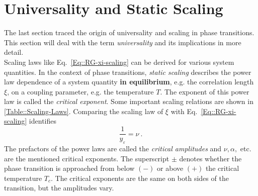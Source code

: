 	\section{Universality and Static Scaling} \label{Section::Universality}
	The last section traced the origin of universality and scaling in phase transitions. This section will deal with the term \textit{universality} and its implications in more detail. \\
	
	Scaling laws like Eq.~\eqref{Eq::RG-xi-scaling} can be derived for various system quantities. In the context of phase transitions, \textit{static scaling} describes the power law dependence of a system quantity \textbf{in equilibrium}, e.g. the correlation length $\xi$, on a coupling parameter, e.g. the temperature $T$. The exponent of this power law is called the \textit{critical exponent}. Some important scaling relations are shown in \autoref{Table::Scaling-Laws}. Comparing the scaling law of $\xi$ with Eq.~\eqref{Eq::RG-xi-scaling} identifies
	\begin{equation}
		\frac{1}{y_\varepsilon} = \nu ~.
	\end{equation}
	The prefactors of the power laws are called the \textit{critical amplitudes} and $\nu, \alpha, $ etc. are the mentioned critical exponents. The superscript $\pm$ denotes whether the phase transition is approached from below $(-)$ or above $(+)$ the critical temperature $T_c$. The critical exponents are the same on both sides of the transition, but the amplitudes vary. \\
	
